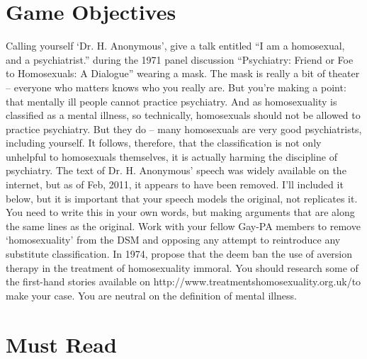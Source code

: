 \section{Game Objectives}
\label{gameobjectives}

Calling yourself `Dr. H. Anonymous', give a talk entitled “I am a homosexual, and a psychiatrist.” during the 1971 panel discussion “Psychiatry: Friend or Foe to Homosexuals: A Dialogue” wearing a mask. The mask is really a bit of theater – everyone who matters knows who you really are. But you're making a point: that mentally ill people cannot practice psychiatry. And as homosexuality is classified as a mental illness, so technically, homosexuals should not be allowed to practice psychiatry. But they do – many homosexuals are very good psychiatrists, including yourself. It follows, therefore, that the classification is not only unhelpful to homosexuals themselves, it is actually harming the discipline of psychiatry.
The text of Dr. H. Anonymous' speech was widely available on the internet, but as of Feb, 2011, it appears to have been removed. I'll included it below, but it is important that your speech models the original, not replicates it. You need to write this in your own words, but making arguments that are along the same lines as the original.
Work with your fellow Gay-PA members to remove `homosexuality' from the DSM and opposing any attempt to reintroduce any substitute classification.
In 1974, propose that the deem ban the use of aversion therapy in the treatment of homosexuality immoral. You should research some of the first-hand stories available on http:\slash \slash www.treatmentshomosexuality.org.uk\slash  to make your case.
You are neutral on the definition of mental illness. 

\section{Must Read}
\label{mustread}

